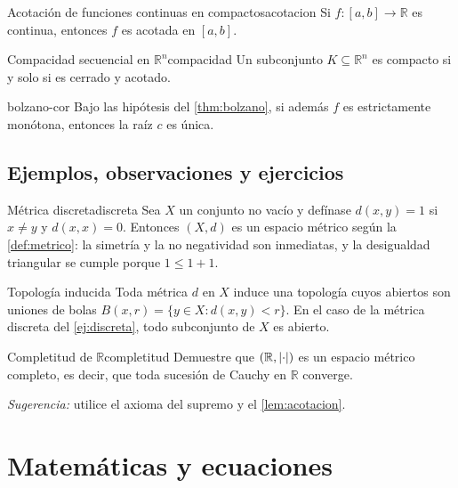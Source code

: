 \documentclass[letterpaper, 11pt]{article}
\newcommand{\R}{\ensuremath{\mathbb{R}}}
\DeclarePairedDelimiter{\abs}{\lvert}{\rvert}
\begin{document}
\begin{lema}{Acotación de funciones continuas en compactos}{acotacion}
    Si $f\colon [a,b] \to \R$ es continua, entonces $f$ es acotada
    en $[a,b]$.
\end{lema}

\begin{proposicion}{Compacidad secuencial en $\R^n$}{compacidad}
    Un subconjunto $K \subseteq \R^n$ es compacto si y solo si es
    cerrado y acotado.
\end{proposicion}

\begin{corolario}{}{bolzano-cor}
    Bajo las hipótesis del \cref{thm:bolzano}, si además $f$ es
    estrictamente monótona, entonces la raíz $c$ es única.
\end{corolario}

\subsection{Ejemplos, observaciones y ejercicios}

\begin{ejemplo}{Métrica discreta}{discreta}
    Sea $X$ un conjunto no vacío y defínase $d(x, y) = 1$ si $x \neq y$
    y $d(x, x) = 0$. Entonces $(X, d)$ es un espacio métrico según la
    \cref{def:metrico}: la simetría y la no negatividad son inmediatas,
    y la desigualdad triangular se cumple porque $1 \leq 1 + 1$.
\end{ejemplo}

\begin{observacion}{Topología inducida}{}
    Toda métrica $d$ en $X$ induce una topología cuyos abiertos son
    uniones de bolas $B(x, r) = \{y \in X : d(x,y) < r\}$. En el caso
    de la métrica discreta del \cref{ej:discreta}, todo subconjunto de
    $X$ es abierto.
\end{observacion}

\begin{ejercicio}{Completitud de $\R$}{completitud}
    Demuestre que $(\R, \abs{\cdot})$ es un espacio métrico completo,
    es decir, que toda sucesión de Cauchy en $\R$ converge.

    \emph{Sugerencia:} utilice el axioma del supremo y el
    \cref{lem:acotacion}.
\end{ejercicio}

\section{Matemáticas y ecuaciones}\label{sec:matematicas}
\end{document}
